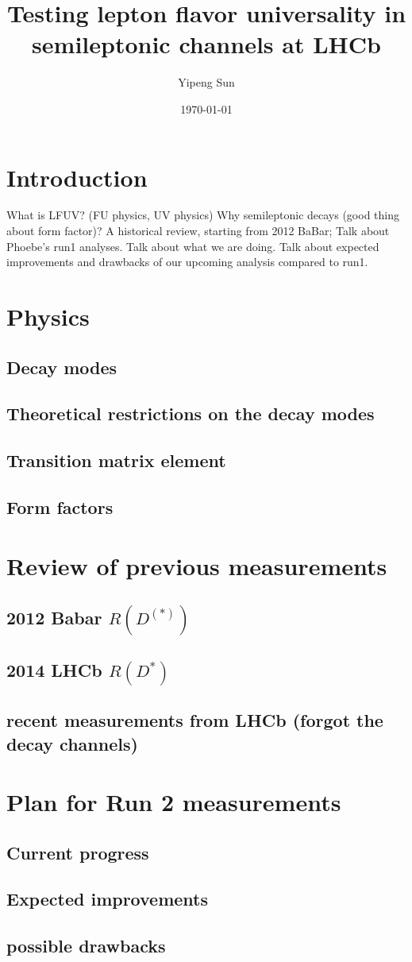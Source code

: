 \documentclass[10pt]{article}
\title{Testing lepton flavor universality in semileptonic channels at LHCb}
\author{Yipeng Sun}
\date{\today}
\begin{document}
\maketitle

\section{Introduction}
What is LFUV? (FU physics, UV physics)
Why semileptonic decays (good thing about form factor)?
A historical review, starting from 2012 BaBar;
Talk about Phoebe's run1 analyses.
Talk about what we are doing.
Talk about expected improvements and drawbacks of our upcoming analysis compared
to run1.

\section{Physics}
\subsection{Decay modes}

\subsection{Theoretical restrictions on the decay modes}

\subsection{Transition matrix element}

\subsection{Form factors}

\section{Review of previous measurements}
\subsection{2012 Babar $R(D^{(*)})$}

\subsection{2014 LHCb $R(D^{*})$}

\subsection{recent measurements from LHCb (forgot the decay channels)}

\section{Plan for Run 2 measurements}
\subsection{Current progress}

\subsection{Expected improvements}

\subsection{possible drawbacks}
\end{document}
